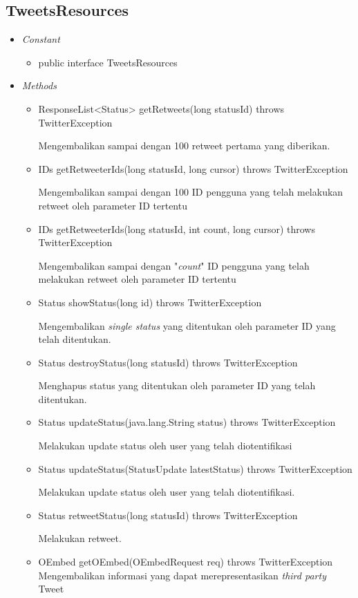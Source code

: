 	\subsection{TweetsResources}
	\begin{itemize}
		\item \textit{Constant}
		
			\begin{itemize}
				\item public interface TweetsResources
			\end{itemize}
		\item \textit{Methods}
		
		\begin{itemize}
			\item ResponseList<Status> getRetweets(long statusId) throws TwitterException
			
			Mengembalikan sampai dengan 100 retweet pertama yang diberikan.
			\item IDs getRetweeterIds(long statusId, long cursor) throws TwitterException
			
			Mengembalikan sampai dengan 100 ID pengguna yang telah melakukan retweet oleh parameter ID tertentu
			\item IDs getRetweeterIds(long statusId, int count, long cursor) throws TwitterException
			
			Mengembalikan sampai dengan "\textit{count}" ID pengguna yang telah melakukan retweet oleh parameter ID tertentu
			\item Status showStatus(long id) throws TwitterException
			
			Mengembalikan \textit{single status} yang ditentukan oleh parameter ID yang telah ditentukan.
			\item Status destroyStatus(long statusId) throws TwitterException
			
			Menghapus status yang ditentukan oleh parameter ID yang telah ditentukan.
			\item Status updateStatus(java.lang.String status) throws TwitterException
			
			Melakukan update status oleh user yang telah diotentifikasi
			\item Status updateStatus(StatusUpdate latestStatus) throws TwitterException
			
			Melakukan update status oleh user yang telah diotentifikasi.
			\item Status retweetStatus(long statusId) throws TwitterException
			
			Melakukan retweet.
			\item OEmbed getOEmbed(OEmbedRequest req) throws TwitterException
			Mengembalikan informasi yang dapat merepresentasikan \textit{third party} Tweet
			

\end{itemize}
\end{itemize}
